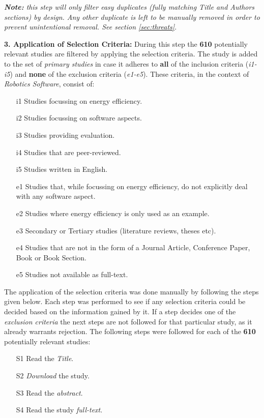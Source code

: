\vspace{1mm}

\textit{\textbf{Note:} this step will only filter easy duplicates (fully matching Title and Authors sections) by design. Any other duplicate is left to be manually removed in order to prevent unintentional removal. See section \ref{sec:threats}}.

\vspace{5mm}

\noindent\textbf{3. Application of Selection Criteria:}
During this step the \textbf{610} potentially relevant studies are filtered by applying the selection criteria. 
The study is added to the set of \textit{primary studies} in case it adheres to \textbf{all} of the inclusion criteria (\textit{i1-i5}) and \textbf{none} of the exclusion criteria (\textit{e1-e5}). 
These criteria, in the context of \textit{Robotics Software}, consist of:
\begin{itemize}
	\item[i1] Studies focussing on energy efficiency.
    \item[i2] Studies focussing on software aspects.
    \item[i3] Studies providing evaluation.
    \item[i4] Studies that are peer-reviewed.
    \item[i5] Studies written in English.
    
	\item[e1] Studies that, while focussing on energy efficiency, do not explicitly deal with any software aspect.
    \item[e2] Studies where energy efficiency is only used as an example.
    \item[e3] Secondary or Tertiary studies (literature reviews, theses etc).
    \item[e4] Studies that are not in the form of a Journal Article, Conference Paper, Book or Book Section.
    \item[e5] Studies not available as full-text.
\end{itemize}

The application of the selection criteria was done manually by following the steps given below. Each step was performed to see if any selection criteria could be decided based on the information gained by it. If a step decides one of the \textit{exclusion criteria} the next steps are not followed for that particular study, as it already warrants rejection. The following steps were followed for each of the \textbf{610} potentially relevant studies:
\begin{itemize}
	\item[S1] Read the \textit{Title}.
	\item[S2] \textit{Download} the study.
	\item[S3] Read the \textit{abstract}.
	\item[S4] Read the study \textit{full-text}.
\end{itemize}

